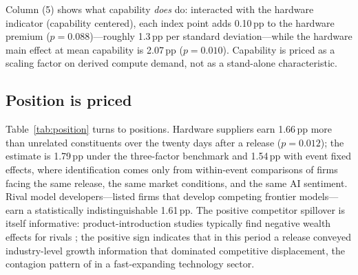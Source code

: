\documentclass[review,12pt,authoryear]{elsarticle}
\newcommand{\pp}{\,pp}
\begin{document}
Column (5) shows what capability \emph{does} do: interacted with the
hardware indicator (capability centered), each index point adds 0.10\pp{} to
the hardware premium ($p=0.088$)---roughly 1.3\pp{} per standard
deviation---while the hardware main effect at mean capability is 2.07\pp{}
($p=0.010$). Capability is priced as a scaling factor on derived compute
demand, not as a stand-alone characteristic.

\subsection{Position is priced}

Table~\ref{tab:position} turns to positions. Hardware suppliers earn
1.66\pp{} more than unrelated constituents over the twenty days after a
release ($p=0.012$); the estimate is 1.79\pp{} under the three-factor
benchmark and 1.54\pp{} with event fixed effects, where identification comes
only from within-event comparisons of firms facing the same release, the
same market conditions, and the same AI sentiment. Rival model
developers---listed firms that develop competing frontier models---earn a
statistically indistinguishable 1.61\pp{}. The positive competitor spillover
is itself informative: product-introduction studies typically find negative
wealth effects for rivals \citep{chen2005}; the positive sign indicates that
in this period a release conveyed industry-level growth information that
dominated competitive displacement, the contagion pattern of
\citet{lang1992} in a fast-expanding technology sector.
\end{document}
